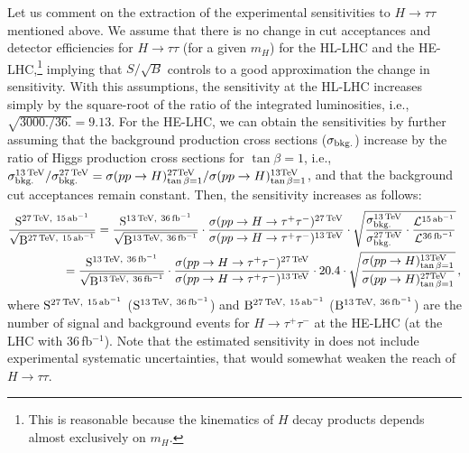 Let us comment on the extraction of the experimental sensitivities to $H\to \tau\tau$ mentioned above. We assume that there is no change in cut acceptances and detector efficiencies for $H\to\tau\tau$ (for a given $m_H$) for the HL-LHC and the HE-LHC,\footnote{This is reasonable because the kinematics of $H$ decay products depends almost exclusively on $m_H$.} implying that $S / \sqrt{B}$ controls to a good approximation the change in sensitivity. With this assumptions, the sensitivity at the HL-LHC increases simply by the square-root of the ratio of the integrated luminosities, i.e., $\sqrt{3000./36.} = 9.13$. For the HE-LHC, we can obtain the sensitivities by further assuming that the background production cross sections ($\sigma_{\rm bkg.}$) increase by the ratio of Higgs production cross sections for $\tan\beta = 1$, i.e., $\sigma_{\rm bkg.}^{\rm 13\, TeV} / \sigma_{\rm bkg.}^{\rm 27\, TeV} = \sigma (p p \to H)^{\rm 27 TeV}_{\tan\beta = 1} / \sigma (p p \to H)^{\rm 13 TeV}_{\tan\beta = 1}$, and that the background cut acceptances remain constant. Then, the sensitivity increases as follows:
\begin{align}
\frac{{\rm S}^{{\rm 27\,TeV,~15\,ab}^{-1}}}{\sqrt{{\rm B}^{{\rm 27\,TeV,~15\,ab}^{-1}}}} 
&= 
\frac{{\rm S}^{{\rm 13\,TeV,~36\,fb}^{-1}}}{\sqrt{{\rm B}^{{\rm 13\,TeV,~36\,fb}^{-1}}}} \cdot \frac{\sigma(p p \to H \to \tau^+ \tau^-)^{\rm 27\,TeV}}{\sigma(p p \to H \to \tau^+ \tau^-)^{\rm 13\,TeV}} \cdot \sqrt{\frac{\sigma_{\rm bkg.}^{\rm 13\,TeV}}{\sigma_{\rm bkg.}^{\rm 27\,TeV}} \cdot \frac{\mathcal{L}^{{\rm 15\,ab}^{-1}}}{\mathcal{L}^{{\rm 36\,fb}^{-1}}}}  
\nonumber \\
& \hskip -1cm = 
\frac{{\rm S}^{{\rm 13\,TeV,~36\,fb}^{-1}}}{\sqrt{{\rm B}^{{\rm 13\,TeV,~36\,fb}^{-1}}}} \cdot \frac{\sigma(p p \to H \to \tau^+ \tau^-)^{\rm 27\,TeV}}{\sigma(p p \to H \to \tau^+ \tau^-)^{\rm 13\,TeV}} \cdot 20.4 \cdot \sqrt{\frac{\sigma (p p \to H)^{\rm 13 TeV}_{\tan\beta = 1}}{\sigma (p p \to H)^{\rm 27 TeV}_{\tan\beta = 1}}} 
\,,
\label{eq:VLFsensitivity}
\end{align}
where ${\rm S}^{{\rm 27\,TeV,~15\,ab}^{-1}}$ (${\rm S}^{{\rm 13\,TeV,~36\,fb}^{-1}}$) and ${\rm B}^{{\rm 27\,TeV,~15\,ab}^{-1}}$ (${\rm B}^{{\rm 13\,TeV,~36\,fb}^{-1}}$) are the number of signal and background events for $H \to \tau^+ \tau^-$ at the HE-LHC (at the LHC with 36\,fb$^{-1}$). Note that the estimated sensitivity in  does not include experimental systematic uncertainties, that would somewhat weaken the reach of $H\to \tau\tau$.

